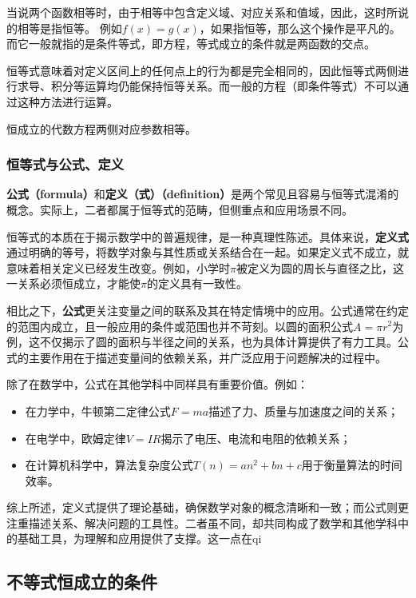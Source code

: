 当说两个函数相等时，由于相等中包含定义域、对应关系和值域，因此，这时所说的相等是指恒等。
例如$f(x)=g(x)$，如果指恒等，那么这个操作是平凡的。而它一般就指的是条件等式，即方程，等式成立的条件就是两函数的交点。

恒等式意味着对定义区间上的任何点上的行为都是完全相同的，因此恒等式两侧进行求导、积分等运算均仍能保持恒等关系。而一般的方程（即条件等式）不可以通过这种方法进行运算。

恒成立的代数方程两侧对应参数相等。

\subsubsection{恒等式与公式、定义}

\textbf{公式（formula）}和\textbf{定义（式）（definition）}是两个常见且容易与恒等式混淆的概念。实际上，二者都属于恒等式的范畴，但侧重点和应用场景不同。

恒等式的本质在于揭示数学中的普遍规律，是一种真理性陈述。具体来说，\textbf{定义式}通过明确的等号，将数学对象与其性质或关系结合在一起。如果定义式不成立，就意味着相关定义已经发生改变。例如，小学时$\pi$被定义为圆的周长与直径之比，这一关系必须恒成立，才能使$\pi$的定义具有一致性。

相比之下，\textbf{公式}更关注变量之间的联系及其在特定情境中的应用。公式通常在约定的范围内成立，且一般应用的条件或范围也并不苛刻。以圆的面积公式$A = \pi r^2$为例，这不仅揭示了圆的面积与半径之间的关系，也为具体计算提供了有力工具。公式的主要作用在于描述变量间的依赖关系，并广泛应用于问题解决的过程中。

除了在数学中，公式在其他学科中同样具有重要价值。例如：
\begin{itemize}
\item 在力学中，牛顿第二定律公式$F = ma$描述了力、质量与加速度之间的关系；
\item 在电学中，欧姆定律$V = IR$揭示了电压、电流和电阻的依赖关系；
\item 在计算机科学中，算法复杂度公式$T(n) = an^2 + bn + c$用于衡量算法的时间效率。
\end{itemize}

综上所述，定义式提供了理论基础，确保数学对象的概念清晰和一致；而公式则更注重描述关系、解决问题的工具性。二者虽不同，却共同构成了数学和其他学科中的基础工具，为理解和应用提供了支撑。这一点在qi

\subsection{不等式恒成立的条件}


